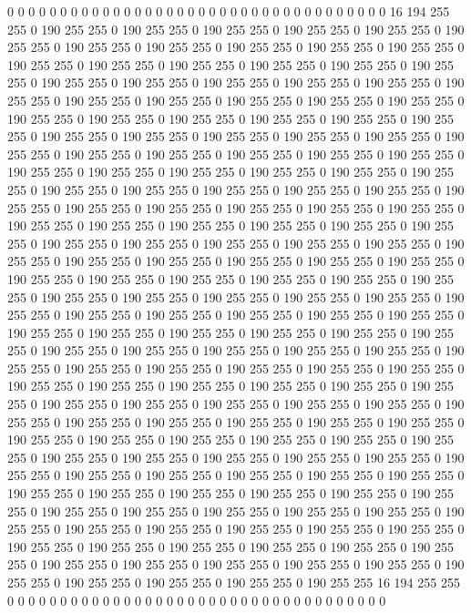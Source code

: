 0 0 0 0 0 0 0 0 0 0 0 0 0 0 0 0 0 0 0 0 0 0 0 0 0 0 0 0 0 0 0 0 0 0 0 0 16 194 255 255 0 190 255 255 0 190 255 255 0 190 255 255 0 190 255 255 0 190 255 255 0 190 255 255 0 190 255 255 0 190 255 255 0 190 255 255 0 190 255 255 0 190 255 255 0 190 255 255 0 190 255 255 0 190 255 255 0 190 255 255 0 190 255 255 0 190 255 255 0 190 255 255 0 190 255 255 0 190 255 255 0 190 255 255 0 190 255 255 0 190 255 255 0 190 255 255 0 190 255 255 0 190 255 255 0 190 255 255 0 190 255 255 0 190 255 255 0 190 255 255 0 190 255 255 0 190 255 255 0 190 255 255 0 190 255 255 0 190 255 255 0 190 255 255 0 190 255 255 0 190 255 255 0 190 255 255 0 190 255 255 
0 190 255 255 0 190 255 255 0 190 255 255 0 190 255 255 0 190 255 255 0 190 255 255 0 190 255 255 0 190 255 255 0 190 255 255 0 190 255 255 0 190 255 255 0 190 255 255 0 190 255 255 0 190 255 255 0 190 255 255 0 190 255 255 0 190 255 255 0 190 255 255 0 190 255 255 0 190 255 255 0 190 255 255 0 190 255 255 0 190 255 255 0 190 255 255 0 190 255 255 0 190 255 255 0 190 255 255 0 190 255 255 0 190 255 255 0 190 255 255 0 190 255 255 0 190 255 255 0 190 255 255 0 190 255 255 0 190 255 255 0 190 255 255 0 190 255 255 0 190 255 255 0 190 255 255 0 190 255 255 0 190 255 255 0 190 255 255 0 190 255 255 0 190 255 255 0 190 255 255 0 190 255 255 0 190 255 255 0 190 255 255 0 190 255 255 0 190 255 255 
0 190 255 255 0 190 255 255 0 190 255 255 0 190 255 255 0 190 255 255 0 190 255 255 0 190 255 255 0 190 255 255 0 190 255 255 0 190 255 255 0 190 255 255 0 190 255 255 0 190 255 255 0 190 255 255 0 190 255 255 0 190 255 255 0 190 255 255 0 190 255 255 0 190 255 255 0 190 255 255 0 190 255 255 0 190 255 255 0 190 255 255 0 190 255 255 0 190 255 255 0 190 255 255 0 190 255 255 0 190 255 255 0 190 255 255 0 190 255 255 0 190 255 255 0 190 255 255 0 190 255 255 0 190 255 255 0 190 255 255 0 190 255 255 0 190 255 255 0 190 255 255 0 190 255 255 0 190 255 255 0 190 255 255 0 190 255 255 0 190 255 255 0 190 255 255 0 190 255 255 0 190 255 255 0 190 255 255 0 190 255 255 0 190 255 255 0 190 255 255 
0 190 255 255 0 190 255 255 0 190 255 255 0 190 255 255 0 190 255 255 0 190 255 255 0 190 255 255 0 190 255 255 0 190 255 255 0 190 255 255 0 190 255 255 0 190 255 255 0 190 255 255 0 190 255 255 0 190 255 255 0 190 255 255 0 190 255 255 0 190 255 255 0 190 255 255 0 190 255 255 0 190 255 255 0 190 255 255 0 190 255 255 0 190 255 255 0 190 255 255 0 190 255 255 0 190 255 255 0 190 255 255 0 190 255 255 0 190 255 255 0 190 255 255 0 190 255 255 0 190 255 255 0 190 255 255 0 190 255 255 0 190 255 255 0 190 255 255 0 190 255 255 0 190 255 255 0 190 255 255 16 194 255 255 0 0 0 0 0 0 0 0 0 0 0 0 0 0 0 0 0 0 0 0 0 0 0 0 0 0 0 0 0 0 0 0 0 0 0 0 

